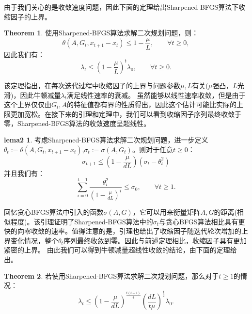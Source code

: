 \documentclass[a4paper,twoside,AutoFakeBold]{article}
\theoremstyle{definition}
\newtheorem{thrm2}{{Theorem}}
\newtheorem{lema2}{{lema2}}
\begin{document}
由于我们关心的是收敛速度问题，因此下面的定理给出Sharpened-BFGS算法下收缩因子的上界。

\begin{thrm2}
    使用Sharpened-BFGS算法求解二次规划问题，则：
    \begin{equation}
        \theta(A, G_t, x_{t + 1} - x_{t})\leq 1 - \frac{\mu}{L}, \qquad \forall t \geq 0,
    \end{equation}
    因此我们有：
    \begin{equation}
        \lambda_t \leq \left(1 - \frac{\mu}{L}\right)^{t}\lambda_0, \qquad \forall t \geq 0.
    \end{equation}
\end{thrm2}

该定理指出，在每次迭代过程中收缩因子的上界与问题参数$\mu,L$有关($\mu$强凸，$L$光滑)，因此牛顿减量$\lambda_t$满足线性速率的衰减。
虽然能够以线性速率收敛，但是由于这个上界仅仅由$G_t,A$的特征值都有界的性质得出，因此这个估计可能比实际的上限更加宽松。在接下来的引理和定理中，我们可以看到收缩因子序列最终收敛于零，Sharpened-BFGS算法的收敛速度呈超线性。

\begin{lema2}
    考虑Sharpened-BFGS算法求解二次规划问题，进一步定义$\theta_t:=\theta(A, G_t, x_{t + 1} - x_{t})$,$\sigma_t := \sigma(A, G_t)$。则对于任意$t\ge 0$：
    \begin{equation}
        \sigma_{t+1} \leq \left(1 - \frac{\mu}{dL}\right)\left(\sigma_t - \theta_t^2\right)
    \end{equation}
    并且我们有：
    \begin{equation}
        \sum_{i = 0}^{t - 1}\frac{\theta^2_i}{(1 - \frac{\mu}{d L})^{i}}  \leq \sigma_0, \qquad \forall t \geq 1. 
    \end{equation}
\end{lema2}

回忆贪心BFGS算法中引入的函数$\sigma (A,G)$，它可以用来衡量矩阵$A,G$的距离(相似程度)。该引理证明了Sharpened-BFGS算法中的$\sigma_t$与贪心BFGS算法相比具有更快的向零收敛的速率。值得注意的是，引理也给出了收缩因子随迭代轮次增加的上界变化情况，整个$\theta_t$序列最终收敛到零。因此与前述定理相比，收缩因子具有更加紧密的上界。
由此我们可以得到牛顿减量超线性收敛的结论，由下面的定理给出。

\begin{thrm2}
    若使用Sharpened-BFGS算法求解二次规划问题，那么对于$t\ge 1$的情况：
    \begin{equation}
        \lambda_t \leq \left(1 - \frac{\mu}{dL}\right)^{\frac{t(t - 1)}{4}} \left(\frac{dL}{t\mu}\right)^{\frac{t}{2}}\lambda_0.
    \end{equation}
\end{thrm2}
\end{document}

